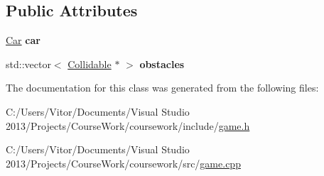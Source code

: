 \subsection*{Public Attributes}
\begin{DoxyCompactItemize}
\item 
\hypertarget{class_game_a6ffa56dab840e2653349ede6ce614140}{}\hyperlink{class_car}{Car} {\bfseries car}\label{class_game_a6ffa56dab840e2653349ede6ce614140}

\item 
\hypertarget{class_game_a2d24cc02e4fef7bba277038a2daabf41}{}std\+::vector$<$ \hyperlink{class_collidable}{Collidable} $\ast$ $>$ {\bfseries obstacles}\label{class_game_a2d24cc02e4fef7bba277038a2daabf41}

\end{DoxyCompactItemize}


The documentation for this class was generated from the following files\+:\begin{DoxyCompactItemize}
\item 
C\+:/\+Users/\+Vitor/\+Documents/\+Visual Studio 2013/\+Projects/\+Course\+Work/coursework/include/\hyperlink{game_8h}{game.\+h}\item 
C\+:/\+Users/\+Vitor/\+Documents/\+Visual Studio 2013/\+Projects/\+Course\+Work/coursework/src/\hyperlink{game_8cpp}{game.\+cpp}\end{DoxyCompactItemize}
